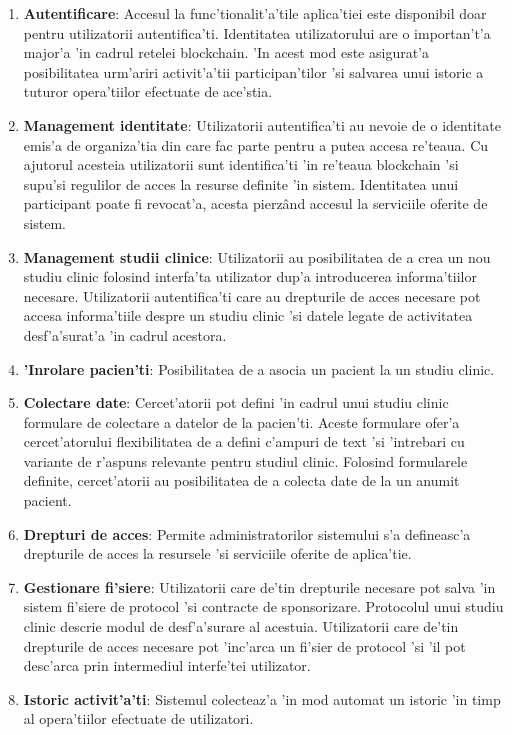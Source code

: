 \documentclass[12pt,a4paper,twoside]{report}
\begin{document}
\begin{enumerate}
	\item \textbf{Autentificare}: Accesul la func'tionalit'a'tile aplica'tiei este disponibil doar pentru utilizatorii autentifica'ti. Identitatea utilizatorului are o importan't'a major'a 'in cadrul retelei blockchain. 'In acest mod este asigurat'a posibilitatea  urm'ariri activit'a'tii participan'tilor 'si salvarea unui istoric a tuturor opera'tiilor efectuate de ace'stia. 
	\item \textbf{Management identitate}: Utilizatorii autentifica'ti au nevoie de o identitate emis'a de organiza'tia din care fac parte pentru a putea accesa re'teaua. Cu ajutorul acesteia utilizatorii sunt identifica'ti 'in re'teaua blockchain 'si supu'si regulilor de acces la resurse definite 'in sistem. Identitatea unui participant poate fi revocat'a, acesta pierz\^and accesul la serviciile oferite de sistem.
	\item \textbf{Management studii clinice}: Utilizatorii au posibilitatea de a crea un nou studiu clinic folosind interfa'ta utilizator dup'a introducerea informa'tiilor necesare.  Utilizatorii autentifica'ti care au drepturile de acces necesare pot accesa informa'tiile despre un studiu clinic 'si datele legate de activitatea desf'a'surat'a 'in cadrul acestora.
	\item \textbf{'Inrolare pacien'ti}: Posibilitatea de a asocia un pacient la un studiu clinic.
	\item \textbf{Colectare date}: Cercet'atorii pot defini 'in cadrul unui studiu clinic formulare de colectare a datelor de la pacien'ti. Aceste formulare ofer'a cercet'atorului flexibilitatea de a defini c'ampuri de text 'si 'intrebari cu variante de r'aspuns relevante pentru studiul clinic. Folosind formularele definite, cercet'atorii au posibilitatea de a colecta date de la un anumit pacient.
	\item \textbf{Drepturi de acces}: Permite administratorilor sistemului s'a defineasc'a drepturile de acces la resursele 'si serviciile oferite de aplica'tie.
	\item \textbf{Gestionare fi'siere}: Utilizatorii care de'tin drepturile necesare pot salva 'in sistem fi'siere de protocol 'si contracte de sponsorizare. Protocolul unui studiu clinic descrie modul de desf'a'surare al acestuia. Utilizatorii care de'tin drepturile de acces necesare pot 'inc'arca un fi'sier de protocol 'si 'il pot desc'arca prin intermediul interfe'tei utilizator.
	\item \textbf{Istoric activit'a'ti}: Sistemul colecteaz'a 'in mod automat un istoric 'in timp al opera'tiilor efectuate de utilizatori. 
\end{enumerate}
\end{document}

